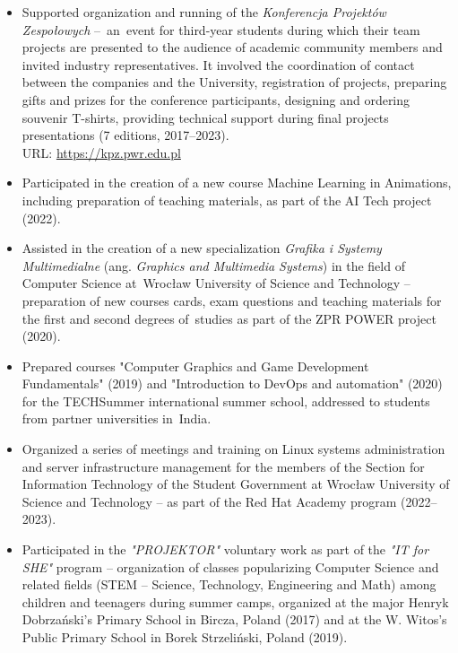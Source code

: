 \begin{itemize}
    \item Supported organization and running of the \textit{Konferencja Projektów Zespołowych} –~an~event for third-year students during which their team projects are presented to the audience of academic community members and invited industry representatives. It involved the coordination of contact between the companies and the University, registration of projects, preparing gifts and prizes for the conference participants, designing and ordering souvenir T-shirts, providing technical support during final projects presentations (7 editions, 2017–2023).\\
        URL: \url{https://kpz.pwr.edu.pl}

    \item Participated in the creation of a new course Machine Learning in Animations, including preparation of teaching materials, as part of the AI Tech project (2022).

    \item Assisted in the creation of a new specialization \textit{Grafika i Systemy Multimedialne} (ang. \textit{Graphics and Multimedia Systems}) in the field of Computer Science at~Wrocław University of Science and Technology – preparation of new courses cards, exam questions and teaching materials for the first and second degrees of~studies as part of the ZPR POWER project (2020).

    \item Prepared courses "Computer Graphics and Game Development Fundamentals" (2019) and "Introduction to DevOps and automation" (2020) for the TECHSummer international summer school, addressed to students from partner universities in~India.

    \item Organized a series of meetings and training on Linux systems administration and server infrastructure management for the members of the Section for Information Technology of the Student Government at Wrocław University of Science and Technology – as part of the Red Hat Academy program (2022–2023).

    \item Participated in the \textit{"PROJEKTOR"} voluntary work as part of the \textit{"IT for SHE"} program – organization of classes popularizing Computer Science and related fields (STEM – Science, Technology, Engineering and Math) among children and teenagers during summer camps, organized at the major Henryk Dobrzański's Primary School in Bircza, Poland (2017) and at the W. Witos's Public Primary School in Borek Strzeliński, Poland (2019).


\end{itemize}
